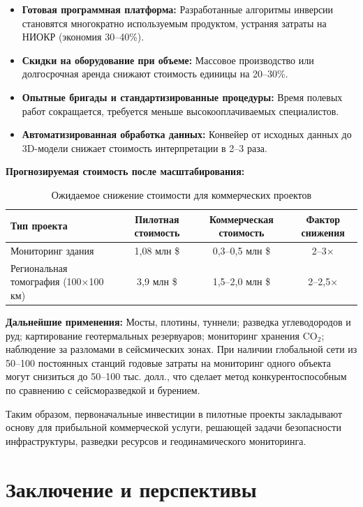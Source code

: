 \documentclass[12pt,a4paper]{article}
\theoremstyle{remark}
\begin{document}
	\begin{itemize}
		\item \textbf{Готовая программная платформа:} Разработанные алгоритмы инверсии становятся многократно используемым продуктом, устраняя затраты на НИОКР (экономия 30–40\%).
		\item \textbf{Скидки на оборудование при объеме:} Массовое производство или долгосрочная аренда снижают стоимость единицы на 20–30\%.
		\item \textbf{Опытные бригады и стандартизированные процедуры:} Время полевых работ сокращается, требуется меньше высокооплачиваемых специалистов.
		\item \textbf{Автоматизированная обработка данных:} Конвейер от исходных данных до 3D-модели снижает стоимость интерпретации в 2–3 раза.
	\end{itemize}
	
	\textbf{Прогнозируемая стоимость после масштабирования:}
	
	\begin{table}[htbp]
		\centering
		\caption{Ожидаемое снижение стоимости для коммерческих проектов}
		\label{tab:scaling}
		\begin{tabular}{lccc}
			\toprule
			\textbf{Тип проекта} & \textbf{Пилотная стоимость} & \textbf{Коммерческая стоимость} & \textbf{Фактор снижения} \\
			\midrule
			Мониторинг здания & 1,08 млн \$ & 0,3–0,5 млн \$ & 2–3× \\
			Региональная томография (100×100 км) & 3,9 млн \$ & 1,5–2,0 млн \$ & 2–2,5× \\
			\bottomrule
		\end{tabular}
	\end{table}
	
	\textbf{Дальнейшие применения:} Мосты, плотины, туннели; разведка углеводородов и руд; картирование геотермальных резервуаров; мониторинг хранения CO$_2$; наблюдение за разломами в сейсмических зонах. При наличии глобальной сети из 50–100 постоянных станций годовые затраты на мониторинг одного объекта могут снизиться до 50–100 тыс. долл., что сделает метод конкурентоспособным по сравнению с сейсморазведкой и бурением.
	
	Таким образом, первоначальные инвестиции в пилотные проекты закладывают основу для прибыльной коммерческой услуги, решающей задачи безопасности инфраструктуры, разведки ресурсов и геодинамического мониторинга.
	
	\section{Заключение и перспективы}
	\label{sec:conclusion}
	
\end{document}

